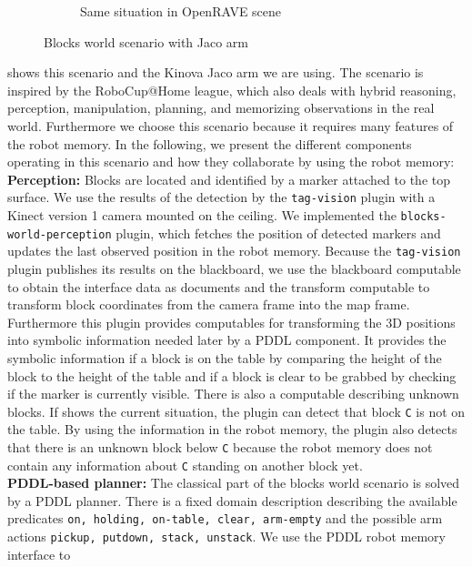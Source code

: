 \begin{figure}
\begin{subfigure}[b]{0.49\textwidth}
  \caption[Same situation in OpenRAVE scene]{Same situation in OpenRAVE scene}
  \label{fig:openrave}
  \end{subfigure}
  \caption[Blocks world scenario with Jaco arm]{Blocks world
    scenario with Jaco arm}
  \label{fig:blocks-world-figure}
\end{figure}
 shows this scenario and the Kinova Jaco arm
we are using. The scenario is inspired by the RoboCup@Home league,
which also deals with hybrid reasoning, perception, manipulation,
planning, and memorizing observations in the real world. Furthermore
we choose this scenario because it requires many features of
the robot memory. In the following, we present the different
components operating in this scenario and how they collaborate by
using the robot memory:
\\
\textbf{Perception:} Blocks are located and identified by a marker
attached to the top surface. We use the results of the detection by
the \texttt{tag-vision} plugin with a Kinect version 1 camera mounted
on the ceiling. We implemented the \texttt{blocks-world-perception}
plugin, which fetches the position of detected markers and updates the
last observed position in the robot memory. Because the
\texttt{tag-vision} plugin publishes its results on the blackboard, we
use the blackboard computable to obtain the interface data as
documents and the transform computable to transform block coordinates
from the camera frame into the map frame. Furthermore this plugin
provides computables for transforming the 3D positions into symbolic
information needed later by a PDDL component. It provides the symbolic
information if a block is on the table by comparing the height of the
block to the height of the table and if a block is clear to be grabbed
by checking if the marker is currently visible. There is also a
computable describing unknown blocks. If 
shows the current situation, the plugin can detect that block
\texttt{C} is not on the table. By using the information in the robot
memory, the plugin also detects that there is an unknown block below
\texttt{C} because the robot memory does not contain any information
about \texttt{C} standing on another block yet.
\\
\textbf{PDDL-based planner:} The classical part of the blocks world scenario
is solved by a PDDL planner. There is a fixed domain description
describing the available predicates \texttt{on, holding, on-table,
  clear, arm-empty} and the possible arm actions \texttt{pickup,
  putdown, stack, unstack}. We use the PDDL robot memory interface to
